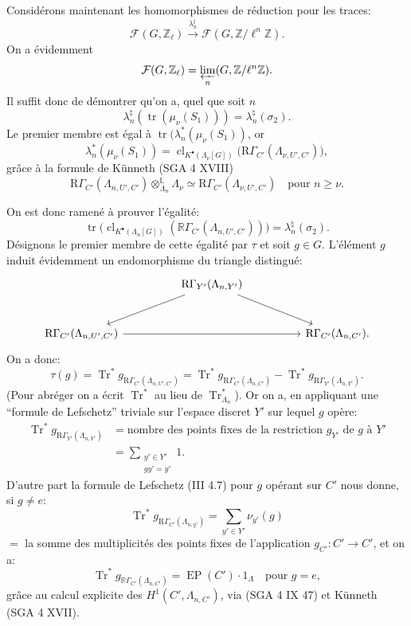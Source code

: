 \documentclass[11pt]{article}
\newcommand{\R}{\mathbb{R}}\newcommand{\RHomCore}{\mathbb{R}\mathrm{Hom}}
\providecommand{\Tr}{\operatorname{Tr}}
\providecommand{\EP}{\operatorname{EP}}
\providecommand{\Tr}{\operatorname{Tr}}
\providecommand{\Tr}{\operatorname{Tr}}
\providecommand{\R}{\mathrm R}
\providecommand{\Tr}{\operatorname{Tr}}
\providecommand{\EP}{\operatorname{EP}}
\providecommand{\clKstar}[1]{\operatorname{cl}_{K^{\bullet}(#1)}}
\providecommand{\RG}{\R\Gamma}
\providecommand{\Tr}{\operatorname{Tr}}
\begin{document}
Considérons maintenant les homomorphismes de réduction pour les traces:
\[
\mathcal F(G,\mathbb Z_\ell)\xrightarrow{\lambda_n^\natural}\mathcal F(G,\mathbb Z/\ell^n\mathbb Z).
\]
On a évidemment
\[
\mathcal F(G,\mathbb Z_\ell)=\varprojlim_n(G,\mathbb Z/\ell^n\mathbb Z).
\]
Il suffit donc de démontrer qu'on a, quel que soit $n$
\[
\lambda_n^\natural(\operatorname{tr}(\mu_\nu(S_1)))=\lambda_n^\natural(\sigma_2).
\]
Le premier membre est égal à $\operatorname{tr}(\lambda_n^*(\mu_\nu(S_1))$, or
\[
\lambda_n^*(\mu_\nu(S_1))
=
\clKstar{\Lambda_\nu[G]}\bigl(\mathrm{R}\Gamma_{C'}(\Lambda_{\nu,U',C'})\bigr),
\]
grâce à la formule de Künneth (SGA 4 XVIII)
\[
\mathrm{R}\Gamma_{C'}(\Lambda_{n,U',C'})\otimes_{\Lambda_n}^{\mathbb{L}}\Lambda_\nu
\simeq \mathrm{R}\Gamma_{C'}(\Lambda_{\nu,U',C'})
\quad\text{pour } n\ge\nu.
\]

On est donc ramené à prouver l'égalité:
\[
\operatorname{tr}\bigl(\clKstar{\Lambda_n[G]}(\RG_{C'}(\Lambda_{n,U',C'}))\bigr)
=
\lambda_n^\natural(\sigma_2).
\]
Désignons le premier membre de cette égalité par $\tau$ et soit $g\in G$. L'élément $g$ induit évidemment un endomorphisme du triangle distingué:
\[
\begin{tikzcd}[column sep=huge,row sep=large]
& \mathrm{R}\Gamma_{Y'}(\Lambda_{n,Y'}) \arrow[dl] \arrow[dr] & \\
\mathrm{R}\Gamma_{C'}(\Lambda_{n,U',C'}) \arrow[rr] && \mathrm{R}\Gamma_{C'}(\Lambda_{n,C'}).
\end{tikzcd}
\]
On a donc:
\[
\tau(g)=\Tr^*g_{\mathrm{R}\Gamma_{C'}(\Lambda_{n,U',C'})}
=\Tr^*g_{\mathrm{R}\Gamma_{C'}(\Lambda_{n,C'})}
-\Tr^*g_{\mathrm{R}\Gamma_{Y'}(\Lambda_{n,Y'})}.
\]
(Pour abréger on a écrit $\Tr^*$ au lieu de $\Tr^*_{\Lambda_n}$). Or on a, en appliquant une ``formule de Lefschetz'' triviale sur l'espace discret $Y'$ sur lequel $g$ opère:
\[
\begin{aligned}
\Tr^*g_{\mathrm{R}\Gamma_{Y'}(\Lambda_{n,Y'})}
&=\text{nombre des points fixes de la restriction } g_{Y'} \text{ de } g \text{ à } Y'\\
&=\sum_{\substack{y'\in Y'\\gy'=y'}}1.
\end{aligned}
\]
D'autre part la formule de Lefschetz (III 4.7) pour $g$ opérant sur $C'$ nous donne, si $g\ne e$:
\[
\Tr^*g_{\mathrm{R}\Gamma_{C'}(\Lambda_{n,y'})}
=
\sum_{y'\in Y'} \nu_{y'}(g)
\]
$=$ la somme des multiplicités des points fixes de l'application $g_{C'}:C'\to C'$, et on a:
\[
\Tr^*g_{\RG_{C'}(\Lambda_{n,C'})}=\EP(C')\cdot1_\Lambda
\quad\text{pour }g=e,
\]
grâce au calcul explicite des $H^1(C',\Lambda_{n,C'})$, via (SGA 4 IX 47) et
Künneth (SGA 4 XVII).
\end{document}
